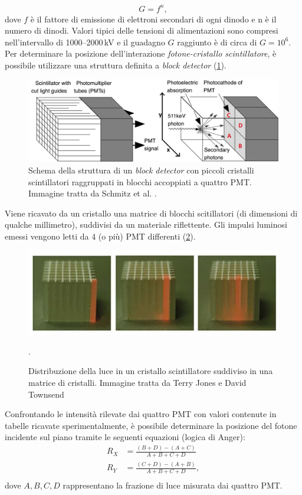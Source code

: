 \begin{equation}
	G = f^n,
\end{equation}
dove $f$ è il fattore di emissione di elettroni secondari di ogni dinodo e n è il numero di dinodi. Valori tipici delle tensioni di alimentazioni sono  compresi nell'intervallo di \numrange[range-phrase=--]{1000}{2000}\,\unit{\kilo\volt} e il guadagno $G$ raggiunto è di circa di $G=10^6$. Per determinare la posizione dell'interazione \textit{fotone-cristallo scintillatore}, è possibile utilizzare una struttura definita a \textit{block detector} (\Fig\ref{fig:block_detector}).
\begin{figure}[tbh]
	\centering
	\includegraphics[width=0.8\linewidth]{./ImageFiles/block_detector.jpg}
	\caption{Schema della struttura di un \textit{block detector} con piccoli cristalli scintillatori raggruppati in blocchi accoppiati a quattro PMT. Immagine tratta da Schmitz et al. \cite{Schmitz2013ThePO}.} 
	\label{fig:block_detector}
\end{figure}
Viene ricavato da un cristallo una matrice di blocchi scitillatori (di dimensioni di qualche millimetro), suddivisi da un materiale riflettente. Gli impulsi luminosi emessi vengono letti da 4 (o più) PMT differenti (\Fig\ref{fig:block_detector_cube}).
\begin{figure}[tbh]
	\centering
	\includegraphics[width=0.6\linewidth]{./ImageFiles/block_detector_lightoncube.jpg}
	\caption{Distribuzione della luce in un cristallo scintillatore suddiviso in una matrice di cristalli. Immagine tratta da Terry Jones e David Townsend \cite{Jones2017}}. 
	\label{fig:block_detector_cube}
\end{figure}
Confrontando le intensità rilevate dai quattro PMT con valori contenute in tabelle ricavate sperimentalmente, è possibile determinare la posizione del fotone incidente sul piano tramite le seguenti equazioni \cite{Bailey2014} (logica di Anger):
\begin{equation}
	\begin{split}
		R_X&=\frac{(B+D)-(A+C)}{A+B+C+D} \\
		R_Y&=\frac{(C+D)-(A+B)}{A+B+C+D}, \\
	\end{split}
\end{equation}
dove $A,B,C,D$ rappresentano la frazione di luce misurata dai quattro PMT.

